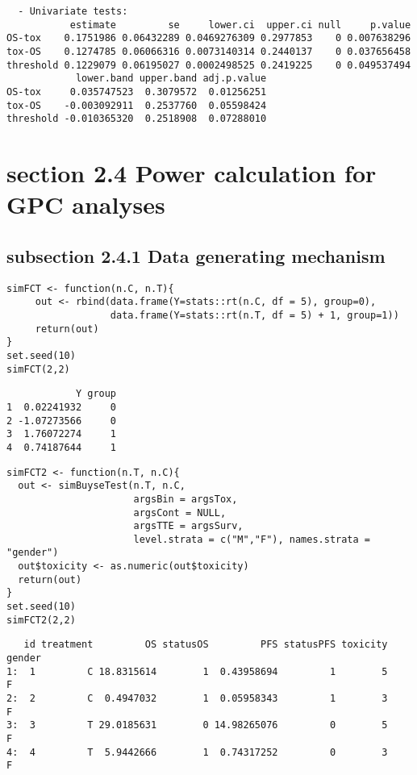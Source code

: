 \documentclass[12pt]{article}
\begin{document}
\begin{verbatim}
  - Univariate tests:
           estimate         se     lower.ci  upper.ci null     p.value
OS-tox    0.1751986 0.06432289 0.0469276309 0.2977853    0 0.007638296
tox-OS    0.1274785 0.06066316 0.0073140314 0.2440137    0 0.037656458
threshold 0.1229079 0.06195027 0.0002498525 0.2419225    0 0.049537494
            lower.band upper.band adj.p.value
OS-tox     0.035747523  0.3079572  0.01256251
tox-OS    -0.003092911  0.2537760  0.05598424
threshold -0.010365320  0.2518908  0.07288010
\end{verbatim}

\section{section 2.4 Power calculation for GPC analyses}
\label{sec:org1c89f4d}
\subsection{subsection 2.4.1 Data generating mechanism}
\label{sec:org13b9b65}
\lstset{language=r,label= ,caption= ,captionpos=b,numbers=none}
\begin{lstlisting}
simFCT <- function(n.C, n.T){
     out <- rbind(data.frame(Y=stats::rt(n.C, df = 5), group=0),
                  data.frame(Y=stats::rt(n.T, df = 5) + 1, group=1))
     return(out)
}
set.seed(10)
simFCT(2,2)
\end{lstlisting}

\begin{verbatim}
            Y group
1  0.02241932     0
2 -1.07273566     0
3  1.76072274     1
4  0.74187644     1
\end{verbatim}



\lstset{language=r,label= ,caption= ,captionpos=b,numbers=none}
\begin{lstlisting}
simFCT2 <- function(n.T, n.C){
  out <- simBuyseTest(n.T, n.C,
                      argsBin = argsTox,
                      argsCont = NULL,
                      argsTTE = argsSurv,
                      level.strata = c("M","F"), names.strata = "gender")
  out$toxicity <- as.numeric(out$toxicity)
  return(out)
}
set.seed(10)
simFCT2(2,2) 
\end{lstlisting}

\begin{verbatim}
   id treatment         OS statusOS         PFS statusPFS toxicity gender
1:  1         C 18.8315614        1  0.43958694         1        5      F
2:  2         C  0.4947032        1  0.05958343         1        3      F
3:  3         T 29.0185631        0 14.98265076         0        5      F
4:  4         T  5.9442666        1  0.74317252         0        3      F
\end{verbatim}
\end{document}
